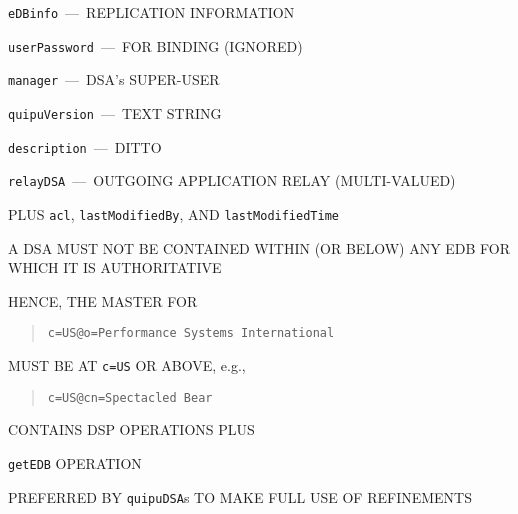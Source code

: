 \begin{bwslide}

\begin{nrtc}
\item	\verb"eDBinfo"~---~REPLICATION INFORMATION

\item	\verb"userPassword"~---~FOR BINDING (IGNORED)

\item	\verb"manager"~---~DSA's SUPER-USER

\item	\verb"quipuVersion"~---~TEXT STRING

\item	\verb"description"~---~DITTO

\item	\verb"relayDSA"~---~OUTGOING APPLICATION RELAY (MULTI-VALUED)

\item	PLUS \verb"acl", \verb"lastModifiedBy", AND \verb"lastModifiedTime"
\end{nrtc}
\end{bwslide}


\begin{bwslide}

\begin{nrtc}
\item	A DSA MUST NOT BE CONTAINED WITHIN (OR BELOW) ANY EDB FOR
	WHICH IT IS AUTHORITATIVE

\item	HENCE, THE MASTER FOR 
\begin{quote}\small\begin{verbatim}
c=US@o=Performance Systems International
\end{verbatim}\end{quote}
	MUST BE AT \verb"c=US" OR ABOVE, e.g.,
\begin{quote}\small\begin{verbatim}
c=US@cn=Spectacled Bear
\end{verbatim}\end{quote}
\end{nrtc}
\end{bwslide}


\begin{bwslide}

\begin{nrtc}
\item	CONTAINS DSP OPERATIONS PLUS
    \begin{nrtc}
    \item	\verb"getEDB" OPERATION
    \end{nrtc}

\item	PREFERRED BY \verb"quipuDSA"s TO MAKE FULL USE OF REFINEMENTS
\end{nrtc}
\end{bwslide}


